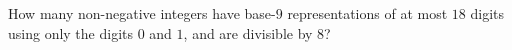 How many non-negative integers have base-$9$ representations of at most $18$ digits using only the digits $0$ and $1$, and are divisible by $8$?
